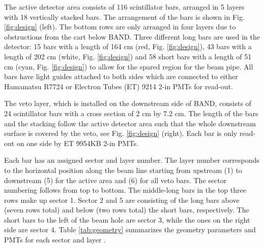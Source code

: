 \documentclass[3p,final,twocolumn]{elsarticle}
\begin{document}
The active detector area consists of 116 scintillator bars, arranged in 5 layers with 18 vertically stacked bars. The arrangement of the bars is shown in Fig. \ref{fig:design} (left). The bottom rows are only arranged in four layers due to obstructions from the cart below BAND.  Three different long bars are used in the detector: 15 bars with a length of 164 \si{\centi\meter} (red, Fig. \ref{fig:design}), 43 bars with a length of 202 \si{\centi\meter} (white, Fig. \ref{fig:design}) and 58 short bars with a length of 51 \si{\centi\meter} (cyan, Fig. \ref{fig:design}) to allow for the spared region for the beam pipe. All bars have light guides attached to both sides which are connected to either Hamamatsu R7724 \cite{pmtR7724} or Electron Tubes (ET) 9214 \cite{pmt9214} 2-in PMTs for read-out.

The veto layer, which is installed on the downstream side of BAND, consists of 24 scintillator bars with a cross section of $2$ \si{\centi\meter} by $7.2$ \si{\centi\meter}. The length of the bars and the stacking follow the active detector area such that the whole downstream surface is covered by the veto, see Fig. \ref{fig:design} (right). Each bar is only read-out on one side by ET 9954KB \cite{pmt9954} 2-in PMTs.

Each bar has an assigned sector and layer number. The layer number corresponds to the horizontal position along the beam line starting from upstream (1) to downstream (5) for the active area and (6) for all veto bars. The sector numbering follows from top to bottom. The middle-long bars in the top three rows make up sector 1. Sector 2 and 5 are consisting of the long bars above (seven rows total) and below (two rows total) the short bars, respectively. The short bars to the left of the beam hole are sector 3, while the ones on the right side are sector 4. Table 
\ref{tab:geometry} summarizes the geometry parameters and PMTs for each sector and layer .
\end{document}
